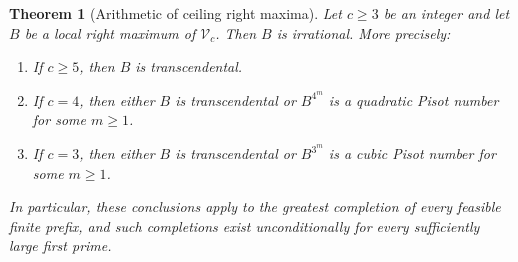 \documentclass[11pt,a4paper]{article}
\newtheorem{theorem}{Theorem}[section]
\theoremstyle{definition}
\theoremstyle{remark}
\numberwithin{equation}{section}
\begin{document}
\begin{theorem}[Arithmetic of ceiling right maxima]\label{tw:thm:ceil-arith}
Let $c\geq3$ be an integer and let $B$ be a local right maximum of
$\mathcal V_c$. Then $B$ is irrational. More precisely:
\begin{enumerate}
\item If $c\geq5$, then $B$ is transcendental.
\item If $c=4$, then either $B$ is transcendental or $B^{4^m}$ is a
quadratic Pisot number for some $m\geq1$.
\item If $c=3$, then either $B$ is transcendental or $B^{3^m}$ is a
cubic Pisot number for some $m\geq1$.
\end{enumerate}
In particular, these conclusions apply to the greatest completion of
every feasible finite prefix, and such completions exist unconditionally
for every sufficiently large first prime.
\end{theorem}
\end{document}
